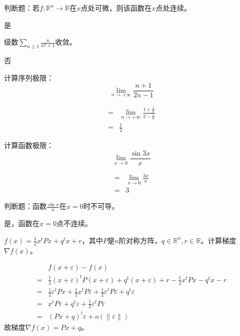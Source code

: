 

\newcommand\Title{2020智能计算数学基础试卷}
\renewcommand\due{due: November 6, 2022}

\newcommand{\tr}{\operatorname{tr}}




\begin{problem}
	判断题：若$f:\mathbb{R}^n\to\mathbb{R}$在$x$点处可微，则该函数在$x$点处连续。
\end{problem}
\begin{solution}
	是
\end{solution}

\begin{problem}
	级数$\sum_{n\ge 1}\frac{n}{n^2+1}$收敛。
\end{problem}
\begin{solution}
	否
\end{solution}

\begin{problem}
	计算序列极限：$$\lim_{n\to +\infty}\frac{n+1}{2n-1}$$
\end{problem}
\begin{solution}
	\begin{align*}
		=&\lim_{n\to +\infty}\frac{1+\frac{1}{n}}{2-\frac{1}{n}}\\
		=&\frac{1}{2}
	\end{align*}
\end{solution}

\begin{problem}
	计算函数极限：$$\lim_{x\to 0}\frac{\sin 3x}{x}$$
\end{problem}
\begin{solution}
	\begin{align*}
		=&\lim_{x\to 0}\frac{3x}{x}\\
		=&3
	\end{align*}
\end{solution}


\begin{problem}
	判断题：函数$\frac{\sin x}{x}$在$x=0$时不可导。
\end{problem}
\begin{solution}
	是，函数在$x=0$点不连续。
\end{solution}

\begin{problem}
	$f(x)=\frac{1}{2}x^tPx+q^tx+r$，其中$P$是$n$阶对称方阵，$q\in\mathbb{R}^{n},r\in\mathbb{R}$。计算梯度$\nabla f(x)$。
\end{problem}
\begin{solution}
	$$\begin{aligned}
		&f(x+\varepsilon)-f(x)\\
		=&\frac{1}{2}(x+\varepsilon)^tP(x+\varepsilon)+q^t(x+\varepsilon)+r-\frac{1}{2}x^tPx-q^tx-r\\
		=&\frac{1}{2}\varepsilon^tPx+\frac{1}{2}x^tP\varepsilon+\frac{1}{2}\varepsilon^tP\varepsilon +q^t\varepsilon\\
		=&x^tP\varepsilon+q^t\varepsilon +\frac{1}{2}\varepsilon ^tP\varepsilon \\
		=&(Px+q)^t\varepsilon +o(\|\varepsilon \|)  
	\end{aligned}$$
	故梯度$\nabla f(x)=Px+q$。
\end{solution}

